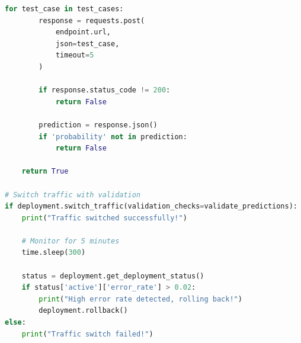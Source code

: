 \begin{exercise}
\begin{lstlisting}[language=Python]
    for test_case in test_cases:
        response = requests.post(
            endpoint.url,
            json=test_case,
            timeout=5
        )

        if response.status_code != 200:
            return False

        prediction = response.json()
        if 'probability' not in prediction:
            return False

    return True

# Switch traffic with validation
if deployment.switch_traffic(validation_checks=validate_predictions):
    print("Traffic switched successfully!")

    # Monitor for 5 minutes
    time.sleep(300)

    status = deployment.get_deployment_status()
    if status['active']['error_rate'] > 0.02:
        print("High error rate detected, rolling back!")
        deployment.rollback()
else:
    print("Traffic switch failed!")
\end{lstlisting}
\end{exercise}


